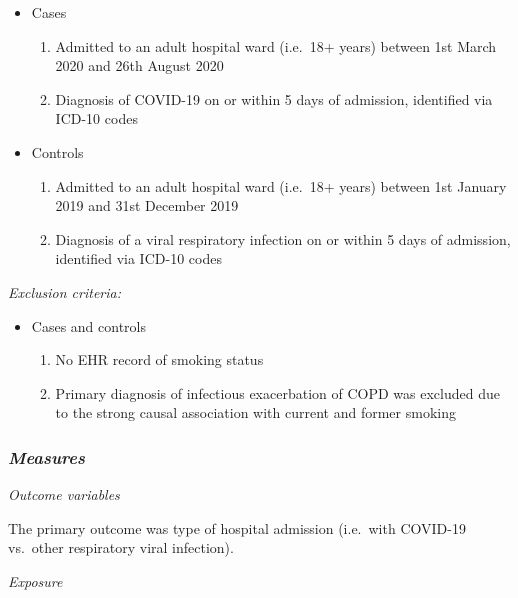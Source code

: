 \documentclass[
]{article}
\providecommand{\tightlist}{%
  \setlength{\itemsep}{0pt}\setlength{\parskip}{0pt}}
\begin{document}
\begin{itemize}
\tightlist
\item
  Cases

  \begin{enumerate}
  \def\labelenumi{\arabic{enumi}.}
  \tightlist
  \item
    Admitted to an adult hospital ward (i.e.~18+ years) between 1st
    March 2020 and 26th August 2020
  \item
    Diagnosis of COVID-19 on or within 5 days of admission, identified
    via ICD-10 codes
  \end{enumerate}
\item
  Controls

  \begin{enumerate}
  \def\labelenumi{\arabic{enumi}.}
  \tightlist
  \item
    Admitted to an adult hospital ward (i.e.~18+ years) between 1st
    January 2019 and 31st December 2019
  \item
    Diagnosis of a viral respiratory infection on or within 5 days of
    admission, identified via ICD-10 codes
  \end{enumerate}
\end{itemize}

\emph{Exclusion criteria:}

\begin{itemize}
\tightlist
\item
  Cases and controls

  \begin{enumerate}
  \def\labelenumi{\arabic{enumi}.}
  \tightlist
  \item
    No EHR record of smoking status
  \item
    Primary diagnosis of infectious exacerbation of COPD was excluded
    due to the strong causal association with current and former smoking
  \end{enumerate}
\end{itemize}

\hypertarget{measures}{%
\subsubsection{\texorpdfstring{\emph{Measures}}{Measures}}\label{measures}}

\emph{Outcome variables}

The primary outcome was type of hospital admission (i.e.~with COVID-19
vs.~other respiratory viral infection).

\emph{Exposure}
\end{document}
